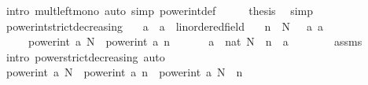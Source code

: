 \begin{isabellebody}
\ {\isacharparenleft}{\kern0pt}intro\ mult{\isacharunderscore}{\kern0pt}left{\isacharunderscore}{\kern0pt}mono{\isacharparenright}{\kern0pt}\ {\isacharparenleft}{\kern0pt}auto\ simp{\isacharcolon}{\kern0pt}\ power{\isacharunderscore}{\kern0pt}int{\isacharunderscore}{\kern0pt}def{\isacharparenright}{\kern0pt}\isanewline
\ \ \isamarkupfalse%
\ \isamarkupfalse%
\ {\isacharquery}{\kern0pt}thesis\ \isamarkupfalse%
\ simp\isanewline
{}\isamarkupfalse%
%
\endisatagproof
{\isafoldproof}%
%
\isadelimproof
\isanewline
%
\endisadelimproof
\isanewline
{}\isamarkupfalse%
\ power{\isacharunderscore}{\kern0pt}int{\isacharunderscore}{\kern0pt}strict{\isacharunderscore}{\kern0pt}decreasing{\isacharcolon}{\kern0pt}\isanewline
\ \ \ a\ {\isacharcolon}{\kern0pt}{\isacharcolon}{\kern0pt}\ {\isachardoublequoteopen}{\isacharprime}{\kern0pt}a\ {\isacharcolon}{\kern0pt}{\isacharcolon}{\kern0pt}\ linordered{\isacharunderscore}{\kern0pt}field{\isachardoublequoteclose}\isanewline
\ \ \ {\isachardoublequoteopen}n\ {\isacharless}{\kern0pt}\ N{\isachardoublequoteclose}\ {\isachardoublequoteopen}{}\ {\isacharless}{\kern0pt}\ a{\isachardoublequoteclose}\ {\isachardoublequoteopen}a\ {\isacharless}{\kern0pt}\ {}{\isachardoublequoteclose}\isanewline
\ \ \ \ \ {\isachardoublequoteopen}power{\isacharunderscore}{\kern0pt}int\ a\ N\ {\isacharless}{\kern0pt}\ power{\isacharunderscore}{\kern0pt}int\ a\ n{\isachardoublequoteclose}\isanewline
%
\isadelimproof
%
\endisadelimproof
%
\isatagproof
{}\isamarkupfalse%
\ {\isacharminus}{\kern0pt}\isanewline
\ \ \isamarkupfalse%
\ {\isacharasterisk}{\kern0pt}{\isacharcolon}{\kern0pt}\ {\isachardoublequoteopen}a\ {\isacharcircum}{\kern0pt}\ nat\ {\isacharparenleft}{\kern0pt}N\ {\isacharminus}{\kern0pt}\ n{\isacharparenright}{\kern0pt}\ {\isacharless}{\kern0pt}\ a\ {\isacharcircum}{\kern0pt}\ {}{\isachardoublequoteclose}\isanewline
\ \ \ \ \isamarkupfalse%
\ assms\ \isamarkupfalse%
\ {\isacharparenleft}{\kern0pt}intro\ power{\isacharunderscore}{\kern0pt}strict{\isacharunderscore}{\kern0pt}decreasing{\isacharparenright}{\kern0pt}\ auto\isanewline
\ \ \isamarkupfalse%
\ {\isachardoublequoteopen}power{\isacharunderscore}{\kern0pt}int\ a\ N\ {\isacharequal}{\kern0pt}\ power{\isacharunderscore}{\kern0pt}int\ a\ n\ {\isacharasterisk}{\kern0pt}\ power{\isacharunderscore}{\kern0pt}int\ a\ {\isacharparenleft}{\kern0pt}N\ {\isacharminus}{\kern0pt}\ n{\isacharparenright}{\kern0pt}{\isachardoublequoteclose}\isanewline

\end{isabellebody}
